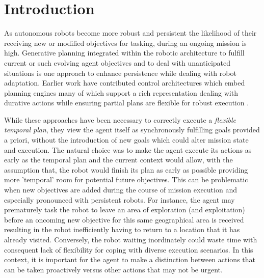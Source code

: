 \section{Introduction}
\label{sec:intro}

As autonomous robots become more robust and persistent the likelihood
of their receiving new or modified objectives for tasking, during an
ongoing mission is high. Generative planning integrated within the
robotic architecture to fulfill current or such evolving agent
objectives and to deal with unanticipated situations is one approach
to enhance persistence while dealing with robot adaptation.  Earlier
work
\cite{AmbrosIngerson88,Haigh98,alami:1998p820,mus98,chien99,mus04,py10}
have contributed control architectures which embed planning engines
many of which support a rich representation dealing with durative
actions while ensuring partial plans are flexible for robust execution
\cite{lemai-chenevier2004}.


While these approaches have been necessary to correctly execute a
\emph{flexible temporal plan}, they view the agent itself as
synchronously fulfilling goals provided a priori, without the
introduction of new goals which could alter mission state and
execution.
The natural choice was to make the agent execute its actions as early
as the temporal plan and the current context would allow, with the
assumption that, the robot would finish its plan as early as possible
providing more 'temporal' room for potential future objectives.  This
can be problematic when new objectives are added during the course of
mission execution and especially pronounced with persistent
robots. For instance, the agent may prematurely task the robot to
leave an area of exploration (and exploitation) before an oncoming new
objective for this same geographical area is received resulting in the
robot inefficiently having to return to a location that it has already
visited. Conversely, the robot waiting inordinately could waste time
with consequent lack of flexibility for coping with diverse execution
scenarios. In this context, it is important for the agent to make a
distinction between actions that can be taken proactively versus other
actions that may not be urgent.

